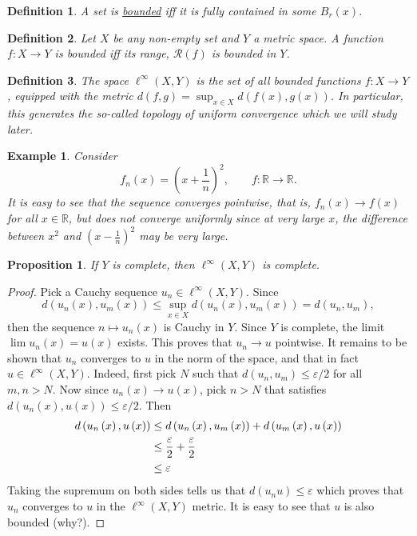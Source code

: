 \documentclass[letterpaper,twoside,11pt]{article}
\theoremstyle{mystyle}
\newtheorem{definition}{Definition}[section]
\newtheorem{prop}{Proposition}[section]
\newtheorem*{ex}{Example}
\newcommand{\R}{{\mathbb R}}
\begin{document}
\begin{definition}
A set is \underline{bounded} iff it is fully contained in some $B_r(x)$. 
\end{definition}

\begin{definition}
Let $X$ be any non-empty set and $Y$ a metric space. A function $f:X\to Y$ is bounded iff its range, $\mathcal R(f)$ is bounded in $Y$.  
\end{definition}

\begin{definition}
The space $\ell^\infty(X,Y)$ is the set of all bounded functions $f:X\to Y$, equipped with the metric $d(f,g) = \sup_{x\in X} d\left(f(x), g(x)\right)$. In particular, this generates the so-called topology of uniform convergence which we will study later. 
\end{definition}

\begin{ex}
  Consider 
  \[f_n(x) = \left( x + \frac{1}{n}\right)^2,\qquad f:\R\to\R.\]
  It is easy to see that the sequence converges pointwise, that is, $f_n(x) \to f(x) $ for all $x\in \R$, but does not converge uniformly since at very large $x$, the difference between $x^2$ and $(x-\frac{1}{n})^2$ may be very large. 
\end{ex}

\begin{prop}
  If $Y$ is complete, then $\ell^\infty (X, Y)$ is complete. 
\end{prop}
\begin{proof}
  Pick a Cauchy sequence $u_n\in \ell^\infty(X, Y)$. Since 
  \[d\left( {{u_n}\left( x \right),{u_m}\left( x \right)} \right) \leq \mathop {\sup }\limits_{x \in X} d\left( {{u_n}\left( x \right),{u_m}\left( x \right)} \right) = d\left( {{u_n},{u_m}} \right),\]
  then the sequence $n\mapsto u_n(x)$ is Cauchy in $Y$. Since $Y$ is complete, the limit $\lim u_n(x) = u(x)$ exists. This proves that $u_n\to u$ pointwise. It remains to be shown that $u_n$ converges to $u$ in the norm of the space, and that in fact $u\in \ell^\infty(X, Y)$. 
  Indeed, first pick $N$ such that $d(u_n, u_m)\leq \varepsilon/2$ for all $m,n>N$. Now since $u_n(x)\to u(x)$, pick $n>N$ that satisfies $d\left( {{u_n}\left( x \right),u\left( x \right)} \right) \leq \varepsilon /2$. Then 
  \begin{align*}
    d\left( {{u_n}\left( x \right),u\left( x \right)} \right) &\leq d\left( {{u_n}\left( x \right),{u_m}\left( x \right)} \right) + d\left( {{u_m}\left( x \right),u\left( x \right)} \right) \hfill \\
     &\leq \frac{\varepsilon }{2} + \frac{\varepsilon }{2} \hfill \\
     &\leq \varepsilon  
  \end{align*} 
  Taking the supremum on both sides tells us that $d(u_n u)\leq \varepsilon$ which proves that $u_n$ converges to $u$ in the $\ell^\infty(X,Y)$ metric. It is easy to see that $u$ is also bounded (why?). 
\end{proof}
\end{document}
